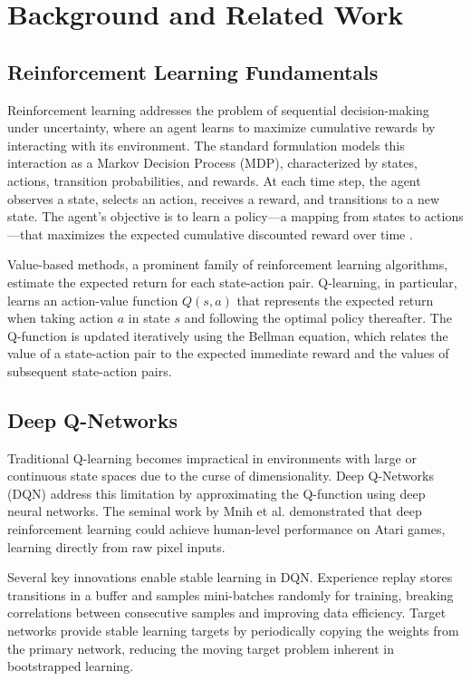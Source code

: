 \section{Background and Related Work}

\subsection{Reinforcement Learning Fundamentals}

Reinforcement learning addresses the problem of sequential decision-making under uncertainty, where an agent learns to maximize cumulative rewards by interacting with its environment. The standard formulation models this interaction as a Markov Decision Process (MDP), characterized by states, actions, transition probabilities, and rewards. At each time step, the agent observes a state, selects an action, receives a reward, and transitions to a new state. The agent's objective is to learn a policy—a mapping from states to actions—that maximizes the expected cumulative discounted reward over time \cite{sutton2018reinforcement}.

Value-based methods, a prominent family of reinforcement learning algorithms, estimate the expected return for each state-action pair. Q-learning, in particular, learns an action-value function $Q(s,a)$ that represents the expected return when taking action $a$ in state $s$ and following the optimal policy thereafter. The Q-function is updated iteratively using the Bellman equation, which relates the value of a state-action pair to the expected immediate reward and the values of subsequent state-action pairs.

\subsection{Deep Q-Networks}

Traditional Q-learning becomes impractical in environments with large or continuous state spaces due to the curse of dimensionality. Deep Q-Networks (DQN) address this limitation by approximating the Q-function using deep neural networks. The seminal work by Mnih et al. \cite{mnih2015human} demonstrated that deep reinforcement learning could achieve human-level performance on Atari games, learning directly from raw pixel inputs.

Several key innovations enable stable learning in DQN. Experience replay stores transitions in a buffer and samples mini-batches randomly for training, breaking correlations between consecutive samples and improving data efficiency. Target networks provide stable learning targets by periodically copying the weights from the primary network, reducing the moving target problem inherent in bootstrapped learning.

